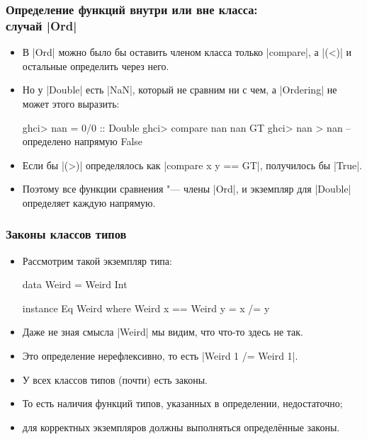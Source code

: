 \documentclass[10pt]{beamer}
\begin{document}
\begin{frame}[fragile]
  \frametitle{Определение функций внутри или вне класса:\\случай \haskinline|Ord|}
  \begin{itemize}
    \item В \haskinline|Ord| можно было бы оставить членом класса только \haskinline|compare|, а \haskinline|(<)| и остальные определить через него.
    \item Но у \haskinline|Double| есть \haskinline|NaN|, который не сравним ни с чем, а \haskinline|Ordering| не может этого выразить:
          \begin{haskell}
            ghci> nan = 0/0 :: Double
            ghci> compare nan nan
            GT
            ghci> nan > nan  -- определено напрямую
            False
          \end{haskell}
    \item Если бы \haskinline|(>)| определялось как \haskinline|compare x y == GT|, получилось бы \haskinline|True|.
    \item Поэтому все функции сравнения "--- члены \haskinline|Ord|, и экземпляр для \haskinline|Double| определяет каждую напрямую.
  \end{itemize}
\end{frame}

\begin{frame}[fragile]
  \frametitle{Законы классов типов}
  \begin{itemize}
    \item Рассмотрим такой экземпляр типа:
          \begin{haskell}
            data Weird = Weird Int

            instance Eq Weird where
                Weird x == Weird y = x /= y
          \end{haskell}
    \item Даже не зная смысла \haskinline|Weird| мы видим, что что-то здесь не так. \pause
    \item Это определение нерефлексивно, то есть \haskinline|Weird 1 /= Weird 1|.
    \item У всех классов типов (почти) есть законы.
    \item То есть наличия функций типов, указанных в определении, недостаточно;
    \item для корректных экземпляров должны выполняться определённые законы.
  \end{itemize}
\end{frame}
\end{document}
